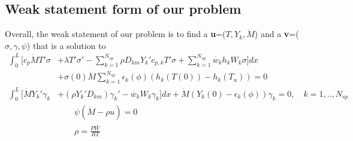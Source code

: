 \documentclass{article}
\begin{document}
\subsection{Weak statement form of our problem}
  Overall, the weak statement of our problem is to find a \textbf{u}=($T,Y_{k},\dot{M}$) and a \textbf{v}=($\sigma,\gamma,\psi$) that is a solution to
  \begin{align*}
    \int_{0}^{L}[c_{p}\dot{M}T'\sigma&+\lambda T'\sigma '-\sum_{k=1}^{N_{sp}}\rho D_{km}Y_{k}'c_{p,k}T'\sigma+\sum_{k=1}^{N_{sp}}\dot{w_{k}}h_{k}W_{k}\sigma ]dx  \\
    &+ \sigma(0)\dot{M}\sum_{k=1}^{N_{sp}}\epsilon _{k}(\phi)(h_{k}(T(0))-h_{k}(T_{u})) = 0 \\
    \int_{0}^{L}[\dot{M}Y_{k}'\gamma_{k}&+(\rho Y_{k}'D_{km})\gamma_{k}'-\dot{w_{k}}W_{k}\gamma_{k}]dx + \dot{M}(Y_{k}(0)-\epsilon_{k}(\phi))\gamma_{k} = 0,\quad k=1,..,N_{sp} \\
   &\qquad \psi(\dot{M}-\rho u) = 0 \\
    &\qquad\rho = \frac{P\bar{W}}{RT} 
    \end{align*}
\end{document}
